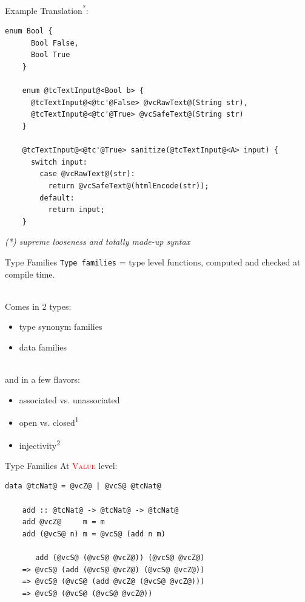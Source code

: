 \documentclass[xcolor={usenames,dvipsnames}]{beamer}
\newcommand{\hvalcon}[1]{\textcolor{Red}{\textsc{#1}}}
\begin{document}
\begin{frame}[fragile]{Example}
  Translation\textsuperscript{*}:
  \begin{lstlisting}[style=hask]
    enum Bool {
      Bool False,
      Bool True
    }

    enum @tcTextInput@<Bool b> {
      @tcTextInput@<@tc'@False> @vcRawText@(String str),
      @tcTextInput@<@tc'@True> @vcSafeText@(String str)
    }

    @tcTextInput@<@tc'@True> sanitize(@tcTextInput@<A> input) {
      switch input:
        case @vcRawText@(str):
          return @vcSafeText@(htmlEncode(str));
        default:
          return input;
    }
  \end{lstlisting}
  \textit{\tiny{(*) supreme looseness and totally made-up syntax}}
\end{frame}

\begin{frame}[fragile]{Type Families}
  \texttt{Type families} = type level functions, computed and checked at compile time.

  \ \\
  \pause
  Comes in 2 types:
  \begin{itemize}
    \item type synonym families
    \item data families
  \end{itemize}

  \ \\
  \pause
  and in a few flavors:
  \begin{itemize}
    \item associated vs. unassociated
    \item open vs. closed\textsuperscript{1}
    \item injectivity\textsuperscript{2}
  \end{itemize}
\end{frame}

\begin{frame}[fragile]{Type Families}
  At \hvalcon{Value} level:
  \begin{lstlisting}[style=hask]
    data @tcNat@ = @vcZ@ | @vcS@ @tcNat@

    add :: @tcNat@ -> @tcNat@ -> @tcNat@
    add @vcZ@     m = m
    add (@vcS@ n) m = @vcS@ (add n m)

       add (@vcS@ (@vcS@ @vcZ@)) (@vcS@ @vcZ@)
    => @vcS@ (add (@vcS@ @vcZ@) (@vcS@ @vcZ@))
    => @vcS@ (@vcS@ (add @vcZ@ (@vcS@ @vcZ@)))
    => @vcS@ (@vcS@ (@vcS@ @vcZ@))
  \end{lstlisting}
\end{frame}
\end{document}
